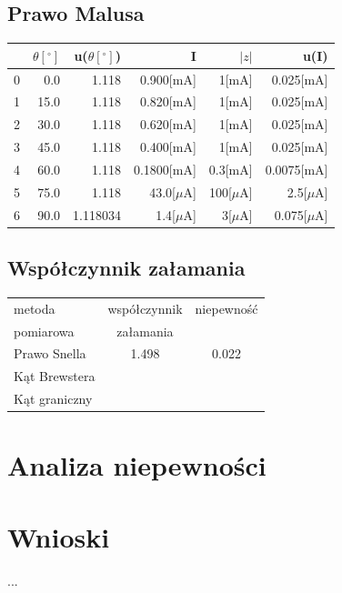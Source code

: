\documentclass[a4paper,10pt]{article}
\begin{document}
\subsection{Prawo Malusa}
\begin{tabular}{lrrrrr}
\toprule
{} &$\theta[^\circ]$&u($\theta[^\circ]$)&I&$|z|$&u(I) \\
\midrule
0 &  0.0 & 1.118 & 0.900[mA] & 1[mA] & 0.025[mA] \\
1 & 15.0 & 1.118 & 0.820[mA] & 1[mA] & 0.025[mA] \\
2 & 30.0 & 1.118 & 0.620[mA] & 1[mA] & 0.025[mA] \\
3 & 45.0 & 1.118 & 0.400[mA] & 1[mA] & 0.025[mA] \\
4 & 60.0 & 1.118 & 0.1800[mA] & 0.3[mA] & 0.0075[mA] \\
5 & 75.0 & 1.118 & 43.0[$\mu$A] & 100[$\mu$A] & 2.5[$\mu$A] \\
6 &  90.0 &  1.118034 & 1.4[$\mu$A] &  3[$\mu$A] &  0.075[$\mu$A] \\
\bottomrule
\end{tabular}

\subsection{Współczynnik załamania}
\begin{tabular}{|l|c|c|}
  \toprule
  \hline
  metoda & współczynnik &niepewność \\
  pomiarowa & załamania & & \\\hline
  Prawo Snella & 1.498 & 0.022 \\\hline
  Kąt Brewstera&  &  \\\hline
  Kąt graniczny&  &  \\\hline
\bottomrule
\end{tabular}

\section{Analiza niepewności}

\section{Wnioski}
\paragraph{}...
\end{document}
